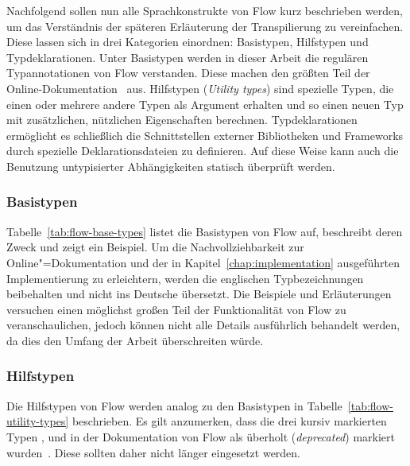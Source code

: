 Nachfolgend sollen nun alle Sprachkonstrukte von Flow kurz beschrieben werden, um das Verständnis der späteren Erläuterung der Transpilierung zu vereinfachen. Diese lassen sich in drei Kategorien einordnen: Basistypen, Hilfstypen und Typdeklarationen.
Unter Basistypen werden in dieser Arbeit die regulären Typannotationen von Flow verstanden. Diese machen den größten Teil der Online-Dokumentation~\autocite{FLOW:TYPE_ANNOTATIONS} aus.
Hilfstypen (\textit{Utility types}) sind spezielle Typen, die einen oder mehrere andere Typen als Argument erhalten und so einen neuen Typ mit zusätzlichen, nützlichen Eigenschaften berechnen.
Typdeklarationen ermöglicht es schließlich die Schnittstellen externer Bibliotheken und Frameworks durch spezielle Deklarationsdateien zu definieren. Auf diese Weise kann auch die Benutzung untypisierter Abhängigkeiten statisch überprüft werden.

\subsubsection{Basistypen}
\label{subsec:flow:base-types}

Tabelle~\ref{tab:flow-base-types} listet die Basistypen von Flow auf, beschreibt deren Zweck und zeigt ein Beispiel. Um die Nachvollziehbarkeit zur Online"=Dokumentation und der in Kapitel~\ref{chap:implementation} ausgeführten Implementierung zu erleichtern, werden die englischen Typbezeichnungen beibehalten und nicht ins Deutsche übersetzt. Die Beispiele und Erläuterungen versuchen einen möglichst großen Teil der Funktionalität von Flow zu veranschaulichen, jedoch können nicht alle Details ausführlich behandelt werden, da dies den Umfang der Arbeit überschreiten würde.



\subsubsection{Hilfstypen}
\label{subsec:flow:utility-types}

Die Hilfstypen von Flow werden analog zu den Basistypen in Tabelle~\ref{tab:flow-utility-types} beschrieben. Es gilt anzumerken, dass die drei kursiv markierten Typen ,  und  in der Dokumentation von Flow als überholt (\textit{deprecated}) markiert wurden~\autocite{FLOW:UTILITY_TYPES}. Diese sollten daher nicht länger eingesetzt werden.

